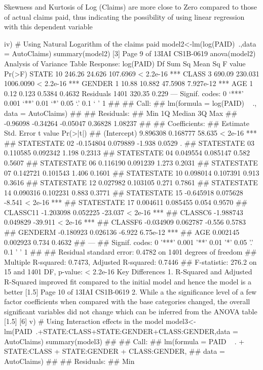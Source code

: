 \documentclass[a4paper,12pt]{article}
\begin{document}
Skewness and Kurtosis of Log (Claims) are more close to Zero compared to those of actual
claims paid, thus indicating the possibility of using linear regression with this dependent
variable


iv)
# Using Natural Logarithm of the claims paid
model2<-lm(log(PAID)~.,data = AutoClaims)
summary(model2)
[3]
Page 9 of 13IAI
CS1B-0619
anova(model2)
Analysis of Variance Table
Response: log(PAID)
Df Sum Sq Mean Sq F value Pr(>F)
STATE
10 246.26 24.626 107.6969 < 2.2e-16 ***
CLASS
3 690.09 230.031 1006.0090 < 2.2e-16 ***
GENDER
1 10.88 10.882 47.5908 7.927e-12 ***
AGE
1 0.12 0.123 0.5384 0.4632
Residuals 1401 320.35 0.229
---
Signif. codes: 0 ‘***’ 0.001 ‘**’ 0.01 ‘*’ 0.05 ‘.’ 0.1 ‘ ’ 1
##
## Call:
## lm(formula = log(PAID) ~ ., data = AutoClaims)
##
## Residuals:
## Min
1Q Median
3Q Max
## -0.96098 -0.34264 -0.05047 0.36828 1.08237
##
## Coefficients:
##
Estimate Std. Error t value Pr(>|t|)
## (Intercept) 9.896308 0.168777 58.635 < 2e-16 ***
## STATESTATE 02 -0.154804 0.079889 -1.938 0.0529 .
## STATESTATE 03 0.110585 0.092342 1.198 0.2313
## STATESTATE 04 0.049554 0.085147 0.582 0.5607
## STATESTATE 06 0.116190 0.091239 1.273 0.2031
## STATESTATE 07 0.142721 0.101543 1.406 0.1601
## STATESTATE 10 0.098014 0.107391 0.913 0.3616
## STATESTATE 12 0.027982 0.103105 0.271 0.7861
## STATESTATE 14 0.090316 0.102231 0.883 0.3771
## STATESTATE 15 -0.645918 0.075628 -8.541 < 2e-16 ***
## STATESTATE 17 0.004611 0.085455 0.054 0.9570
## CLASSC11 -1.203098 0.052225 -23.037 < 2e-16 ***
## CLASSC6
-1.988743 0.049829 -39.911 < 2e-16 ***
## CLASSF6
-0.034909 0.062787 -0.556 0.5783
## GENDERM
-0.180923 0.026136 -6.922 6.75e-12 ***
## AGE
0.002145 0.002923 0.734 0.4632
## ---
## Signif. codes: 0 '***' 0.001 '**' 0.01 '*' 0.05 '.' 0.1 ' ' 1
##
## Residual standard error: 0.4782 on 1401 degrees of freedom
## Multiple R-squared: 0.7473, Adjusted R-squared: 0.7446
## F-statistic: 276.2 on 15 and 1401 DF, p-value: < 2.2e-16
Key Differences
1. R-Squared and Adjusted R-Squared improved
fit compared to the initial model
and hence the model is a better
[1.5]
Page 10 of 13IAI
CS1B-0619
2. While a the significance level of a few factor coefficients when compared with the
base categories changed, the overall significant variables did not change which can
be inferred from the ANOVA table
[1.5]
[6]
v)
# Using Interaction effects in the model
model3<-lm(PAID~.+STATE:CLASS+STATE:GENDER+CLASS:GENDER,data = AutoClaims)
summary(model3)
##
## Call:
## lm(formula = PAID ~ . + STATE:CLASS + STATE:GENDER + CLASS:GENDER,
## data = AutoClaims)
##
## Residuals:
## Min
\end{document}
